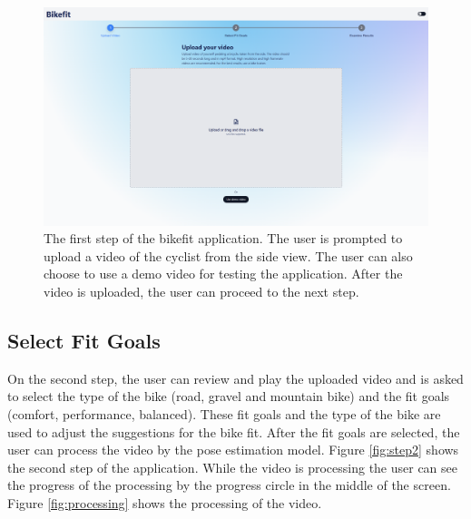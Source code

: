 \begin{figure}[htbp]
    \centering
    \includegraphics[width=\textwidth]{obrazky-figures/step1.png}
    \caption{The first step of the bikefit application. The user is prompted to upload a video of the cyclist from the side view. The user can also choose to use a demo video for testing the application. After the video is uploaded, the user can proceed to the next step.}
    \label{fig:step1}
\end{figure}

\subsection{Select Fit Goals}  On the second step, the user can review and play the uploaded video and is asked to select the type of the bike (road, gravel and mountain bike) and the fit goals (comfort, performance, balanced). These fit goals and the type of the bike are used to adjust the suggestions for the bike fit. After the fit goals are selected, the user can process the video by the pose estimation model. Figure \ref{fig:step2} shows the second step of the application. While the video is processing the user can see the progress of the processing by the progress circle in the middle of the screen. Figure \ref{fig:processing} shows the processing of the video.

